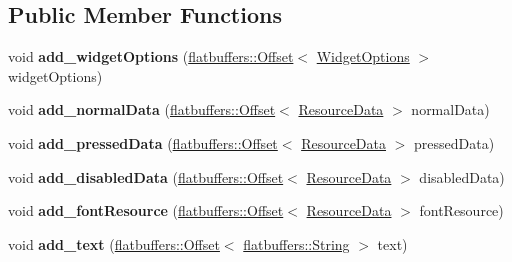 \subsection*{Public Member Functions}
\begin{DoxyCompactItemize}
\item 
\mbox{\label{structflatbuffers_1_1ButtonOptionsBuilder_a09fa54f6a950a737e970ccaa34700758}} 
void {\bfseries add\+\_\+widget\+Options} (\hyperlink{structflatbuffers_1_1Offset}{flatbuffers\+::\+Offset}$<$ \hyperlink{structflatbuffers_1_1WidgetOptions}{Widget\+Options} $>$ widget\+Options)
\item 
\mbox{\label{structflatbuffers_1_1ButtonOptionsBuilder_ac632c659c809d13675566c7476ce0a87}} 
void {\bfseries add\+\_\+normal\+Data} (\hyperlink{structflatbuffers_1_1Offset}{flatbuffers\+::\+Offset}$<$ \hyperlink{structflatbuffers_1_1ResourceData}{Resource\+Data} $>$ normal\+Data)
\item 
\mbox{\label{structflatbuffers_1_1ButtonOptionsBuilder_acad8adc94bf1f0ec8a95d0fe105415ab}} 
void {\bfseries add\+\_\+pressed\+Data} (\hyperlink{structflatbuffers_1_1Offset}{flatbuffers\+::\+Offset}$<$ \hyperlink{structflatbuffers_1_1ResourceData}{Resource\+Data} $>$ pressed\+Data)
\item 
\mbox{\label{structflatbuffers_1_1ButtonOptionsBuilder_aec4af1faa9d62b9703065a6b0e85e8ba}} 
void {\bfseries add\+\_\+disabled\+Data} (\hyperlink{structflatbuffers_1_1Offset}{flatbuffers\+::\+Offset}$<$ \hyperlink{structflatbuffers_1_1ResourceData}{Resource\+Data} $>$ disabled\+Data)
\item 
\mbox{\label{structflatbuffers_1_1ButtonOptionsBuilder_ab8696b14764b04cc8e0353ff98e53ae0}} 
void {\bfseries add\+\_\+font\+Resource} (\hyperlink{structflatbuffers_1_1Offset}{flatbuffers\+::\+Offset}$<$ \hyperlink{structflatbuffers_1_1ResourceData}{Resource\+Data} $>$ font\+Resource)
\item 
\mbox{\label{structflatbuffers_1_1ButtonOptionsBuilder_a98fe3566459700a935876968e3052456}} 
void {\bfseries add\+\_\+text} (\hyperlink{structflatbuffers_1_1Offset}{flatbuffers\+::\+Offset}$<$ \hyperlink{structflatbuffers_1_1String}{flatbuffers\+::\+String} $>$ text)

\end{DoxyCompactItemize}
